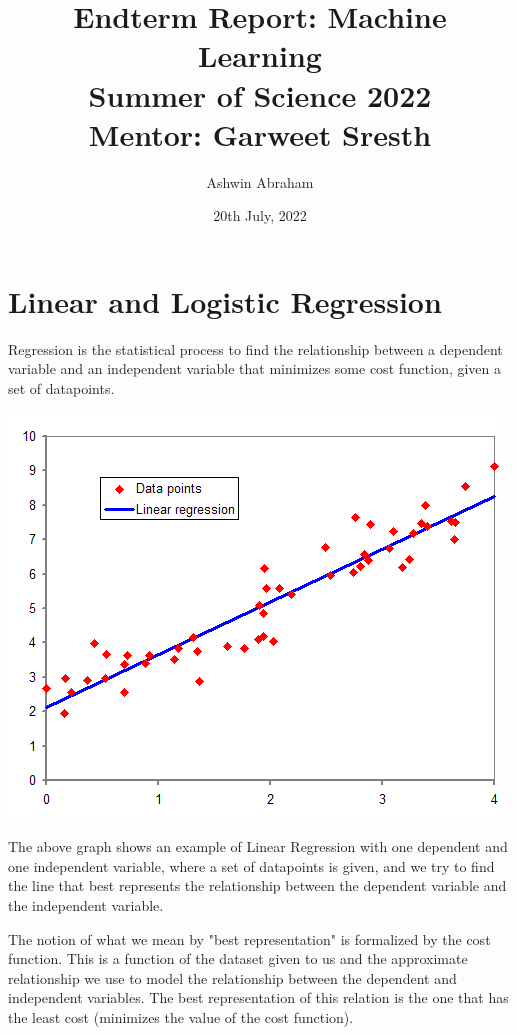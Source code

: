 \documentclass[12 pt]{report}
\title{
    {\textbf{Endterm Report: Machine Learning}}\\
    {Summer of Science 2022}\\
    {\large Mentor: Garweet Sresth} \\
}
\author{Ashwin Abraham}
\date{20th July, 2022}
\begin{document}
    \maketitle
    \tableofcontents

    \chapter{Linear and Logistic Regression}
    Regression is the statistical process to find the relationship between a dependent variable and an independent variable that minimizes some 
    cost function, given a set of datapoints.

    \begin{center}
        \includegraphics[scale = 0.7]{Normdist_regression}
    \end{center}


    The above graph shows an example of Linear Regression with one dependent and one independent variable, where a set of datapoints is given, and we try to find the line that best represents the
    relationship between the dependent variable and the independent variable.

    The notion of what we mean by "best representation" is formalized by the cost function. This is a function of the dataset given to us and the 
    approximate relationship we use to model the relationship between the dependent and independent variables. The best representation of this 
    relation is the one that has the least cost (minimizes the value of the cost function).
\end{document}
